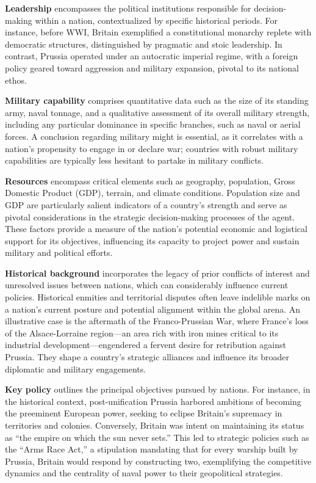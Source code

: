 \documentclass{article}
\begin{document}
\textbf{Leadership} encompasses the political institutions responsible for decision-making within a nation, contextualized by specific historical periods. For instance, before WWI, Britain exemplified a constitutional monarchy replete with democratic structures, distinguished by pragmatic and stoic leadership. In contrast, Prussia operated under an autocratic imperial regime, with a foreign policy geared toward aggression and military expansion, pivotal to its national ethos.

\textbf{Military capability} comprises quantitative data such as the size of its standing army, naval tonnage, and a qualitative assessment of its overall military strength, including any particular dominance in specific branches, such as naval or aerial forces. A conclusion regarding military might is essential, as it correlates with a nation's propensity to engage in or declare war; countries with robust military capabilities are typically less hesitant to partake in military conflicts.

\textbf{Resources} encompass critical elements such as geography, population, Gross Domestic Product (GDP), terrain, and climate conditions. Population size and GDP are particularly salient indicators of a country's strength and serve as pivotal considerations in the strategic decision-making processes of the agent. These factors provide a measure of the nation's potential economic and logistical support for its objectives, influencing its capacity to project power and sustain military and political efforts.

\textbf{Historical background} incorporates the legacy of prior conflicts of interest and unresolved issues between nations, which can considerably influence current policies. Historical enmities and territorial disputes often leave indelible marks on a nation's current posture and potential alignment within the global arena. An illustrative case is the aftermath of the Franco-Prussian War, where France's loss of the Alsace-Lorraine region---an area rich with iron mines critical to its industrial development---engendered a fervent desire for retribution against Prussia. They shape a country's strategic alliances and influence its broader diplomatic and military engagements.

\textbf{Key policy} outlines the principal objectives pursued by nations. For instance, in the historical context, post-unification Prussia harbored ambitions of becoming the preeminent European power, seeking to eclipse Britain's supremacy in territories and colonies. Conversely, Britain was intent on maintaining its status as ``the empire on which the sun never sets.'' This led to strategic policies such as the ``Arms Race Act,'' a stipulation mandating that for every warship built by Prussia, Britain would respond by constructing two, exemplifying the competitive dynamics and the centrality of naval power to their geopolitical strategies.
\end{document}
